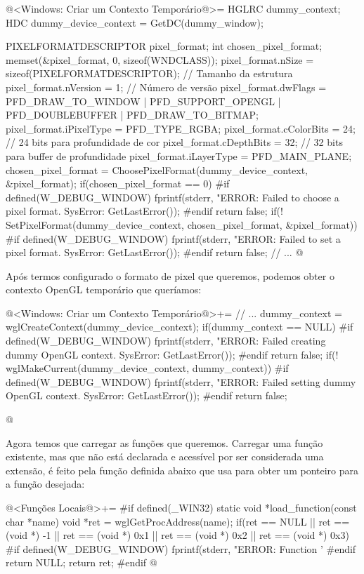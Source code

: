 \iniciocodigo
@<Windows: Criar um Contexto Temporário@>=
HGLRC dummy_context;
HDC dummy_device_context = GetDC(dummy_window);
{
  PIXELFORMATDESCRIPTOR pixel_format;
  int chosen_pixel_format;
  memset(&pixel_format, 0, sizeof(WNDCLASS));
  pixel_format.nSize = sizeof(PIXELFORMATDESCRIPTOR); // Tamanho da estrutura
  pixel_format.nVersion = 1; // Número de versão
  pixel_format.dwFlags = PFD_DRAW_TO_WINDOW | PFD_SUPPORT_OPENGL |
                         PFD_DOUBLEBUFFER | PFD_DRAW_TO_BITMAP;
  pixel_format.iPixelType = PFD_TYPE_RGBA;
  pixel_format.cColorBits = 24; // 24 bits para profundidade de cor
  pixel_format.cDepthBits = 32; // 32 bits para buffer de profundidade
  pixel_format.iLayerType = PFD_MAIN_PLANE;
  chosen_pixel_format = ChoosePixelFormat(dummy_device_context, &pixel_format);
  if(chosen_pixel_format == 0){
#if defined(W_DEBUG_WINDOW)
    fprintf(stderr, "ERROR: Failed to choose a pixel format. SysError: %
            GetLastError());
#endif
    return false;
  }
  if(! SetPixelFormat(dummy_device_context, chosen_pixel_format, &pixel_format)){
#if defined(W_DEBUG_WINDOW)
    fprintf(stderr, "ERROR: Failed to set a pixel format. SysError: %
            GetLastError());
#endif
    return false;
  }
  // ...
@
\fimcodigo

Após termos configurado o formato de pixel que queremos, podemos obter
o contexto OpenGL temporário que queríamos:

\iniciocodigo
@<Windows: Criar um Contexto Temporário@>+=
  // ...
  dummy_context = wglCreateContext(dummy_device_context);
  if(dummy_context == NULL){
#if defined(W_DEBUG_WINDOW)
    fprintf(stderr, "ERROR: Failed creating dummy OpenGL context. SysError: %
            GetLastError());
#endif
    return false;
  }
  if(! wglMakeCurrent(dummy_device_context, dummy_context)){
#if defined(W_DEBUG_WINDOW)
    fprintf(stderr, "ERROR: Failed setting dummy OpenGL context. SysError: %
            GetLastError());
#endif
    return false;
  }
}
@
\fimcodigo

Agora temos que carregar as funções que queremos. Carregar uma função
existente, mas que não está declarada e acessível por ser considerada
uma extensão, é feito pela função definida abaixo que usa
 para obter um ponteiro para a função desejada:

\iniciocodigo
@<Funções Locais@>+=
#if defined(_WIN32)
static void *load_function(const char *name){
  void *ret = wglGetProcAddress(name);
  if(ret == NULL || ret == (void *) -1 || ret == (void *) 0x1 ||
     ret == (void *) 0x2 || ret == (void *) 0x3){
#if defined(W_DEBUG_WINDOW)
    fprintf(stderr, "ERROR: Function '%
#endif
    return NULL;
  }
  return ret;
}
#endif
@
\fimcodigo

